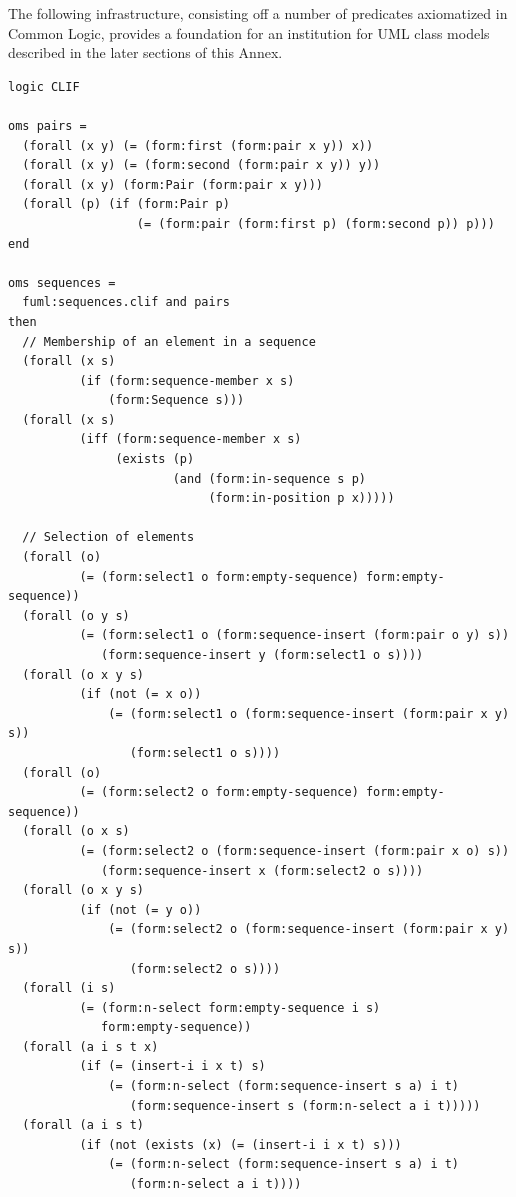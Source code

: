 \documentclass[10pt, a4paper]{isov2}
\begin{document}
The following infrastructure, consisting off a number of predicates
axiomatized in Common Logic, provides a foundation for an institution
for UML class models described in the later sections of this Annex.
%
\begin{lstlisting}[language=clif, basicstyle={\ttfamily\fontsize{8pt}{9pt}\selectfont},
                   morekeywords={then, with, logic, oms, end},
                   morecomment={[l]{//}},
                   mathescape]
logic CLIF

oms pairs =
  (forall (x y) (= (form:first (form:pair x y)) x))
  (forall (x y) (= (form:second (form:pair x y)) y))
  (forall (x y) (form:Pair (form:pair x y)))
  (forall (p) (if (form:Pair p)
                  (= (form:pair (form:first p) (form:second p)) p)))
end

oms sequences =
  fuml:sequences.clif and pairs
then
  // Membership of an element in a sequence
  (forall (x s)
          (if (form:sequence-member x s)
              (form:Sequence s)))
  (forall (x s)
          (iff (form:sequence-member x s)
               (exists (p) 
                       (and (form:in-sequence s p)
                            (form:in-position p x)))))

  // Selection of elements
  (forall (o)
          (= (form:select1 o form:empty-sequence) form:empty-sequence))
  (forall (o y s)
          (= (form:select1 o (form:sequence-insert (form:pair o y) s)) 
             (form:sequence-insert y (form:select1 o s))))
  (forall (o x y s)
          (if (not (= x o))
              (= (form:select1 o (form:sequence-insert (form:pair x y) s)) 
                 (form:select1 o s))))
  (forall (o)
          (= (form:select2 o form:empty-sequence) form:empty-sequence))
  (forall (o x s)
          (= (form:select2 o (form:sequence-insert (form:pair x o) s)) 
             (form:sequence-insert x (form:select2 o s))))
  (forall (o x y s)
          (if (not (= y o))
              (= (form:select2 o (form:sequence-insert (form:pair x y) s)) 
                 (form:select2 o s))))
  (forall (i s)
          (= (form:n-select form:empty-sequence i s) 
             form:empty-sequence))
  (forall (a i s t x)
          (if (= (insert-i i x t) s)
              (= (form:n-select (form:sequence-insert s a) i t)
                 (form:sequence-insert s (form:n-select a i t)))))
  (forall (a i s t)
          (if (not (exists (x) (= (insert-i i x t) s)))
              (= (form:n-select (form:sequence-insert s a) i t)
                 (form:n-select a i t))))


\end{lstlisting}
\end{document}
